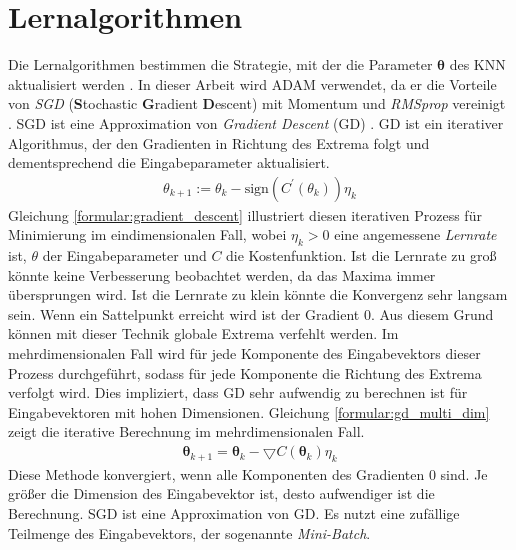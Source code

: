 \section{Lernalgorithmen}
Die Lernalgorithmen bestimmen die Strategie, mit der die Parameter $\boldsymbol\theta$ des KNN aktualisiert werden \cite{higham2019deep}.
In dieser Arbeit wird ADAM verwendet, da er die Vorteile von \textit{SGD} (\textbf{S}tochastic \textbf{G}radient \textbf{D}escent)
mit Momentum und \textit{RMSprop} vereinigt \cite{kingma2014adam, higham2019deep}.
\newline
\newline
SGD ist eine Approximation von \textit{Gradient Descent} (GD) \cite{bengio2017deep}.
GD ist ein iterativer Algorithmus, der den Gradienten in Richtung des Extrema folgt und dementsprechend die Eingabeparameter aktualisiert.
\begin{align}
    \label{formular:gradient_descent}
    \theta_{k+1} := \theta_k - \text{sign}(C^{\prime}(\theta_k))\eta_k
\end{align}
Gleichung \ref{formular:gradient_descent} illustriert diesen iterativen Prozess für Minimierung im eindimensionalen Fall,
wobei $\eta_k > 0$ eine angemessene \textit{Lernrate} ist, $\theta$ der Eingabeparameter und $C$ die Kostenfunktion.
Ist die Lernrate zu groß könnte keine Verbesserung beobachtet werden, da das Maxima immer übersprungen wird.
Ist die Lernrate zu klein könnte die Konvergenz sehr langsam sein.
Wenn ein Sattelpunkt erreicht wird ist der Gradient 0.
Aus diesem Grund können mit dieser Technik globale Extrema verfehlt werden.
\newline
\newline
Im mehrdimensionalen Fall wird für jede Komponente des Eingabevektors dieser Prozess durchgeführt, sodass für jede Komponente
die Richtung des Extrema verfolgt wird.
Dies impliziert, dass GD sehr aufwendig zu berechnen ist für Eingabevektoren mit hohen Dimensionen.
Gleichung \ref{formular:gd_multi_dim} zeigt die iterative Berechnung im mehrdimensionalen Fall.
\begin{align}
    \label{formular:gd_multi_dim}
    \boldsymbol\theta_{k+1} = \boldsymbol\theta_k - \bigtriangledown C(\boldsymbol\theta_k)\eta_k
\end{align}
Diese Methode konvergiert, wenn alle Komponenten des Gradienten 0 sind.
Je größer die Dimension des Eingabevektor ist, desto aufwendiger ist die Berechnung.
\newline
\newline
SGD ist eine Approximation von GD. Es nutzt eine zufällige Teilmenge des Eingabevektors, der sogenannte \textit{Mini-Batch}.
